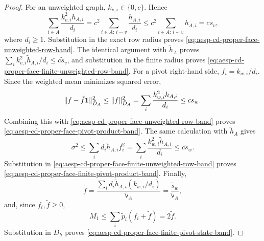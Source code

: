 \begin{proof}
For an unweighted graph, \(k_{v,i}\in\{0,c\}\).  Hence
\begin{equation*}
 \sum_{i\in A}\frac{k_{v,i}^2h_{A,i}}{d_i}
 =c^2\sum_{i\in A:\,i\sim v}\frac{h_{A,i}}{d_i}
 \leq c^2\sum_{i\in A:\,i\sim v}h_{A,i}
 =c s_v,
\end{equation*}
where \(d_i\geq1\).  Substitution in the exact row radius proves
\cref{eq:aesp-cd-proper-face-unweighted-row-band}.  The identical argument
with \(\widetilde h_A\) proves
\(\sum_i k_{v,i}^2\widetilde h_{A,i}/d_i\leq c\widetilde s_v\), and
substitution in the finite radius proves
\cref{eq:aesp-cd-proper-face-finite-unweighted-row-band}.
For a pivot right-hand side, \(f_i=k_{w,i}/d_i\).  Since the weighted mean
minimizes squared error,
\begin{equation*}
 \lVert f-\bar f\mathbf{1}\rVert_{\bar D_A}^2
 \leq\lVert f\rVert_{\bar D_A}^2
 =\sum_i\frac{k_{w,i}^2h_{A,i}}{d_i}
 \leq c s_w.
\end{equation*}
Combining this with
\cref{eq:aesp-cd-proper-face-unweighted-row-band} proves
\cref{eq:aesp-cd-proper-face-pivot-product-band}.
The same calculation with \(\widetilde h_A\) gives
\begin{equation*}
 \sigma^2
 \leq\sum_i d_i\widetilde h_{A,i}f_i^2
 =\sum_i\frac{k_{w,i}^2\widetilde h_{A,i}}{d_i}
 \leq c\widetilde s_w.
\end{equation*}
Substitution in
\cref{eq:aesp-cd-proper-face-finite-unweighted-row-band} proves
\cref{eq:aesp-cd-proper-face-finite-pivot-product-band}.
Finally,
\begin{equation*}
 \widetilde f
 =\frac{\sum_i d_i\widetilde h_{A,i}(k_{w,i}/d_i)}
        {\widetilde{\mathsf v}_A}
 =\frac{\widetilde s_w}{\widetilde{\mathsf v}_A},
\end{equation*}
and, since \(f_i,\widetilde f\geq0\),
\begin{equation*}
 M_1
 \leq\sum_i\widetilde p_i(f_i+\widetilde f)
 =2\widetilde f.
\end{equation*}
Substitution in \(D_h\) proves
\cref{eq:aesp-cd-proper-face-finite-pivot-state-band}.
\end{proof}

